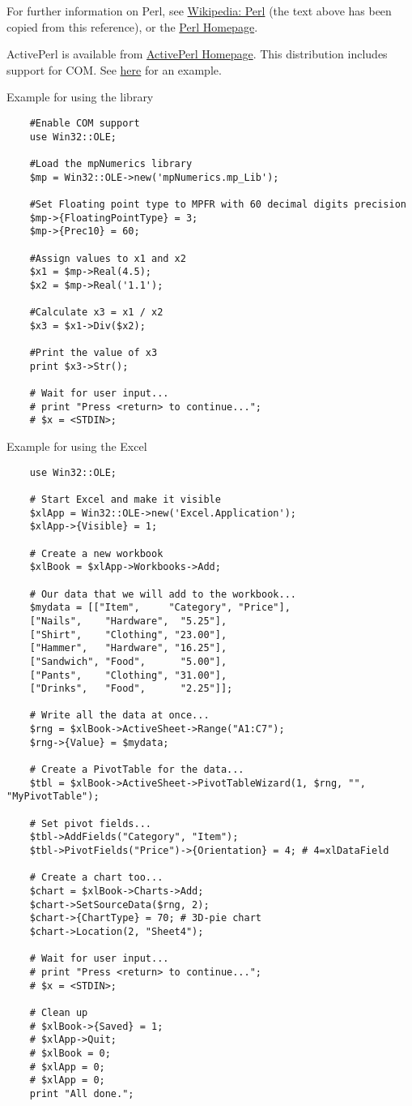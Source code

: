 	\vpara
	For further information on Perl, see \href{http://en.wikipedia.org/wiki/Perl}{Wikipedia: Perl} (the text above has been copied from this reference), or the  \href{http://www.perl.org/}{Perl Homepage}.
	
	\vpara
	ActivePerl is available from  \href{http://www.activestate.com/activeperl/downloads}{ActivePerl Homepage}. This distribution includes support for COM. See \href{http://support.microsoft.com/kb/214797/en-us}{here} for an example.
	
	
	\vpara
	Example for using the library
	
	\begin{lstlisting}
	#Enable COM support
	use Win32::OLE;
	
	#Load the mpNumerics library
	$mp = Win32::OLE->new('mpNumerics.mp_Lib');
	
	#Set Floating point type to MPFR with 60 decimal digits precision
	$mp->{FloatingPointType} = 3;
	$mp->{Prec10} = 60;
	
	#Assign values to x1 and x2
	$x1 = $mp->Real(4.5);
	$x2 = $mp->Real('1.1');
	
	#Calculate x3 = x1 / x2
	$x3 = $x1->Div($x2);
	
	#Print the value of x3
	print $x3->Str();
	
	# Wait for user input...
	# print "Press <return> to continue...";
	# $x = <STDIN>;
	\end{lstlisting}
	
	
	\vpara
	Example for using the Excel
	
	\begin{lstlisting}
	use Win32::OLE;
	
	# Start Excel and make it visible
	$xlApp = Win32::OLE->new('Excel.Application');
	$xlApp->{Visible} = 1;
	
	# Create a new workbook
	$xlBook = $xlApp->Workbooks->Add;
	
	# Our data that we will add to the workbook...
	$mydata = [["Item",     "Category", "Price"], 
	["Nails",    "Hardware",  "5.25"],
	["Shirt",    "Clothing", "23.00"],
	["Hammer",   "Hardware", "16.25"],
	["Sandwich", "Food",      "5.00"],
	["Pants",    "Clothing", "31.00"],
	["Drinks",   "Food",      "2.25"]];
	
	# Write all the data at once...
	$rng = $xlBook->ActiveSheet->Range("A1:C7");
	$rng->{Value} = $mydata;
	
	# Create a PivotTable for the data...
	$tbl = $xlBook->ActiveSheet->PivotTableWizard(1, $rng, "", "MyPivotTable");
	
	# Set pivot fields...
	$tbl->AddFields("Category", "Item");
	$tbl->PivotFields("Price")->{Orientation} = 4; # 4=xlDataField
	
	# Create a chart too...
	$chart = $xlBook->Charts->Add;
	$chart->SetSourceData($rng, 2);
	$chart->{ChartType} = 70; # 3D-pie chart
	$chart->Location(2, "Sheet4");
	
	# Wait for user input...
	# print "Press <return> to continue...";
	# $x = <STDIN>;
	
	# Clean up
	# $xlBook->{Saved} = 1;
	# $xlApp->Quit;
	# $xlBook = 0;
	# $xlApp = 0;
	# $xlApp = 0;
	print "All done.";
	\end{lstlisting}
	
